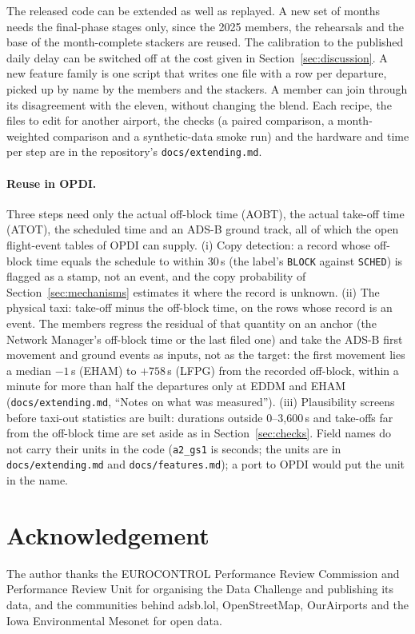 \documentclass[
  manuscript=article,
  layout=preprint,
  year=2026,
  volume=x,
]{extra/joas}
\newcommand{\fld}[1]{\texttt{#1}}
\begin{document}
The released code can be extended as well as replayed. A new set of months needs the final-phase stages only, since the 2025
members, the rehearsals and the base of the month-complete stackers are reused. The calibration to the published daily delay can be
switched off at the cost given in Section~\ref{sec:discussion}. A new feature family is one script that writes one file with a row per
departure, picked up by name by the members and the stackers. A member can join through its disagreement with the eleven, without
changing the blend. Each recipe, the files to edit for another airport, the checks (a paired comparison, a month-weighted comparison and a
synthetic-data smoke run) and the hardware and time per step are in the repository's \texttt{docs/extending.md}.


\paragraph{Reuse in OPDI.} Three steps need only the actual off-block time (AOBT), the actual take-off time (ATOT), the scheduled time and
an ADS-B ground track, all of which the open flight-event tables of OPDI \cite{goens2024opdi} can supply. (i) Copy detection: a record whose
off-block time equals the schedule to within 30\,s (the label's \fld{BLOCK} against \fld{SCHED}) is flagged as a stamp, not an event, and
the copy probability of Section~\ref{sec:mechanisms} estimates it where the record is unknown. (ii) The physical taxi: take-off minus the
off-block time, on the rows whose record is an event. The members regress the residual of that quantity on an anchor (the Network Manager's off-block time or the last filed one) and take the
ADS-B first movement and ground events as inputs, not as the target: the first movement lies a median $-1$\,s (EHAM) to $+758$\,s (LFPG) from the recorded off-block, within a minute for more than half the departures only at EDDM and EHAM (\texttt{docs/extending.md}, ``Notes on what was measured''). (iii) Plausibility screens before taxi-out statistics are built: durations outside 0--3,600\,s and
take-offs far from the off-block time are set aside as in Section~\ref{sec:checks}. Field names do not carry their units in the code (\fld{a2\_gs1} is seconds; the units are in \texttt{docs/extending.md} and \texttt{docs/features.md}); a port to OPDI would put the unit in the name.

\section*{Acknowledgement}
The author thanks the EUROCONTROL Performance Review Commission and Performance Review Unit for organising the Data Challenge and
publishing its data, and the communities behind adsb.lol, OpenStreetMap, OurAirports and the Iowa Environmental Mesonet
for open data.
\end{document}
